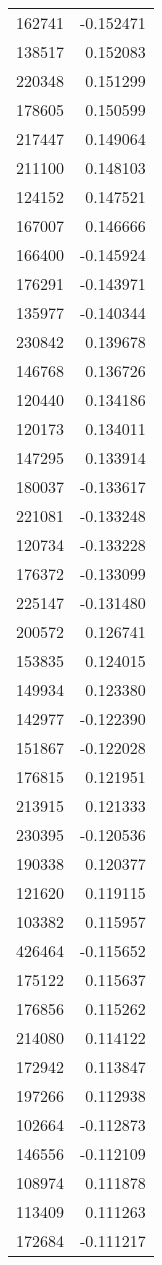 \begin{tabular}{lr}
162741 & -0.152471 \\
138517 & 0.152083 \\
220348 & 0.151299 \\
178605 & 0.150599 \\
217447 & 0.149064 \\
211100 & 0.148103 \\
124152 & 0.147521 \\
167007 & 0.146666 \\
166400 & -0.145924 \\
176291 & -0.143971 \\
135977 & -0.140344 \\
230842 & 0.139678 \\
146768 & 0.136726 \\
120440 & 0.134186 \\
120173 & 0.134011 \\
147295 & 0.133914 \\
180037 & -0.133617 \\
221081 & -0.133248 \\
120734 & -0.133228 \\
176372 & -0.133099 \\
225147 & -0.131480 \\
200572 & 0.126741 \\
153835 & 0.124015 \\
149934 & 0.123380 \\
142977 & -0.122390 \\
151867 & -0.122028 \\
176815 & 0.121951 \\
213915 & 0.121333 \\
230395 & -0.120536 \\
190338 & 0.120377 \\
121620 & 0.119115 \\
103382 & 0.115957 \\
426464 & -0.115652 \\
175122 & 0.115637 \\
176856 & 0.115262 \\
214080 & 0.114122 \\
172942 & 0.113847 \\
197266 & 0.112938 \\
102664 & -0.112873 \\
146556 & -0.112109 \\
108974 & 0.111878 \\
113409 & 0.111263 \\
172684 & -0.111217 \\

\end{tabular}
